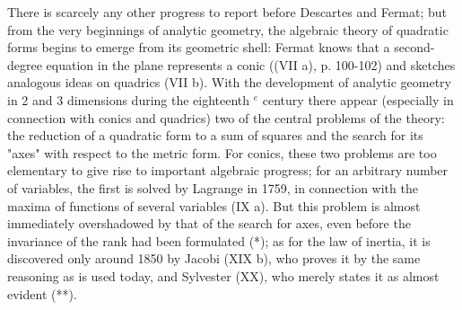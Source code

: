 There is scarcely any other progress to report before Descartes and Fermat; but from the very beginnings of analytic geometry, the algebraic theory of quadratic forms begins to emerge from its geometric shell: Fermat knows that a second-degree equation in the plane represents a conic ((VII a), p. 100-102) and sketches analogous ideas on quadrics (VII b). With the development of analytic geometry in 2 and 3 dimensions during the eighteenth \(^{e}\) century there appear (especially in connection with conics and quadrics) two of the central problems of the theory: the reduction of a quadratic form to a sum of squares and the search for its "axes" with respect to the metric form. For conics, these two problems are too elementary to give rise to important algebraic progress; for an arbitrary number of variables, the first is solved by Lagrange in 1759, in connection with the maxima of functions of several variables (IX a). But this problem is almost immediately overshadowed by that of the search for axes, even before the invariance of the rank had been formulated (*); as for the law of inertia, it is discovered only around 1850 by Jacobi (XIX b), who proves it by the same reasoning as is used today, and Sylvester (XX), who merely states it as almost evident (**).

